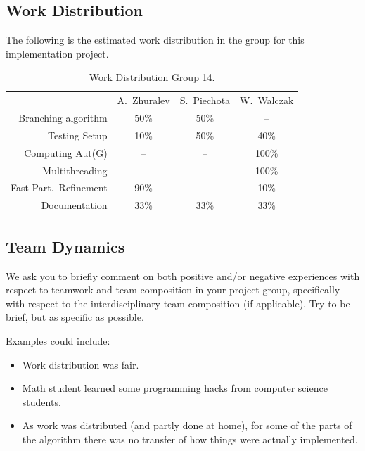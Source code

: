 \documentclass[twoside]{article}
\begin{document}
\subsection{Work Distribution}
The following is the estimated work distribution in the group for this implementation project.
\begin{table}[h]
\centering
\begin{tabular}{r|c|c|c|}
& A.\ Zhuralev & S.\ Piechota& W.\ Walczak\\
\noalign{\smallskip}\hline\hline\noalign{\smallskip}
Branching algorithm& 50\% & 50\%  & -- \\
Testing Setup& 10\% & 50\%  & 40\% \\
Computing Aut(G)& -- & --  & 100\% \\
Multithreading& -- & --  & 100\% \\
Fast Part.\ Refinement& 90\% & --  & 10\% \\
Documentation& 33\% & 33\%  & 33\% \\
\end{tabular}
\caption{Work Distribution Group 14.}\label{tab:workdistr}
\end{table}

\subsection{Team Dynamics}
We ask you to briefly comment on both positive and/or negative experiences with respect to teamwork and team composition in your project group, specifically with respect to the interdisciplinary team composition (if applicable). Try to be brief, but as specific as possible.

\medskip
\noindent Examples could include:
\begin{itemize}
\item[+] Work distribution was fair.
\item[+] Math student learned some programming hacks from computer science students.
\item[-] As work was distributed (and partly done at home), for some of the parts of the algorithm there was no transfer of how things were actually implemented.
\end{itemize}



\end{document}
